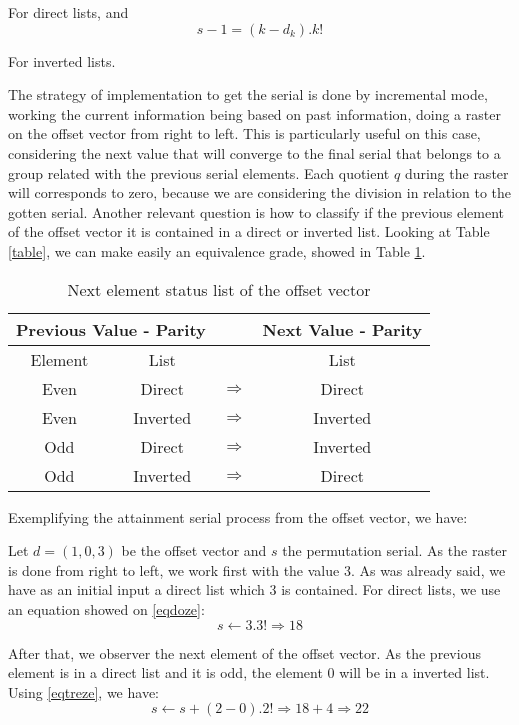 \documentclass {amsart}
\begin{document}
For direct lists, and
\begin{equation}   \label{eqtreze}
s-1 = (k - d_k). k!
\end{equation}

For inverted lists.

The strategy of implementation to get the serial is done by
incremental mode, working the current information being based on
past information, doing a raster on the offset vector from right
to left. This is particularly useful on this case, considering the
next value that will converge to the final serial that belongs to
a group related with the previous serial elements. Each quotient
{$q$} during the raster will corresponds to zero, because we are
considering the division in relation to the gotten serial. Another
relevant question is how to classify if the previous element of
the offset vector it is contained in a direct or inverted list.
Looking at Table \ref{table}, we can make easily an equivalence
grade, showed in Table \ref{tabletres}.
\begin{table}[!hbp]
  \centering
  \caption{Next element status list of the offset vector}
  \label{tabletres}
\begin{tabular}{c|c l c}
\hline
\multicolumn{2}{c|}{Previous Value - Parity} && Next Value - Parity\\
\hline
Element & List && List\\
\hline
  Even & Direct & {$\Longrightarrow$} & Direct\\
  Even & Inverted & {$\Longrightarrow$} & Inverted\\
  Odd & Direct & {$\Longrightarrow$} & Inverted\\
  Odd & Inverted & {$\Longrightarrow$} & Direct\\
\hline
\end{tabular}
\end{table}

Exemplifying the attainment serial process from the offset vector,
we have:

Let {$d = (1,0,3)$} be the offset vector and {$s$} the permutation
serial. As the raster is done from right to left, we work first
with the value {$3$}. As was already said, we have as an initial
input a direct list which {$3$} is contained. For direct lists, we
use an equation showed on \ref{eqdoze}:
\begin{equation}
s \leftarrow 3 . 3!  \Rightarrow 18
\end{equation}

After that, we observer the next element of the offset vector. As
the previous element is in a direct list and it is odd, the
element {$0$} will be in a inverted list. Using \ref{eqtreze}, we
have:
\begin{equation}
s \leftarrow s + (2 - 0) . 2! \Rightarrow 18 + 4 \Rightarrow 22
\end{equation}
\end{document}
